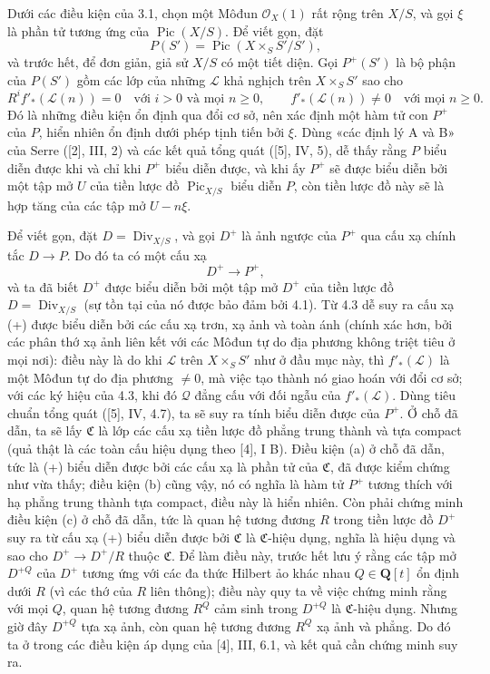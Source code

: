 
Dưới các điều kiện của 3.1, chọn một Môđun $\mathcal O_X(1)$ rất rộng trên
$X/S$, và gọi $\xi$ là phần tử tương ứng của $\operatorname{Pic}(X/S)$. Để
viết gọn, đặt
\[
P(S')=\operatorname{Pic}(X\times_SS'/S'),
\]
và trước hết, để đơn giản, giả sử $X/S$ có một tiết diện. Gọi $P^+(S')$ là bộ
phận của $P(S')$ gồm các lớp của những $\mathcal L$ khả nghịch trên
$X\times_SS'$ sao cho
\[
R^if'_*(\mathcal L(n))=0\quad\text{với $i>0$ và mọi $n\geq0$},
\qquad
f'_*(\mathcal L(n))\neq0\quad\text{với mọi $n\geq0$}.
\]
Đó là những điều kiện ổn định qua đổi cơ sở, nên xác định một hàm tử con
$P^+$ của $P$, hiển nhiên ổn định dưới phép tịnh tiến bởi $\xi$. Dùng «các
định lý A và B» của Serre ([2], III, 2) và các kết quả tổng quát ([5], IV, 5),
dễ thấy rằng $P$ biểu diễn được khi và chỉ khi $P^+$ biểu diễn được, và khi ấy
$P^+$ sẽ được biểu diễn bởi một tập mở $U$ của tiền lược đồ
$\operatorname{Pic}_{X/S}$ biểu diễn $P$, còn tiền lược đồ này sẽ là hợp tăng
của các tập mở $U-n\xi$.

Để viết gọn, đặt $D=\operatorname{Div}_{X/S}$, và gọi $D^+$ là ảnh ngược của
$P^+$ qua cấu xạ chính tắc $D\longrightarrow P$. Do đó ta có một cấu xạ
\begin{equation}
D^+\longrightarrow P^+,
\tag{+}
\end{equation}
và ta đã biết $D^+$ được biểu diễn bởi một tập mở $D^+$ của tiền lược đồ
$D=\operatorname{Div}_{X/S}$ (sự tồn tại của nó được bảo đảm bởi 4.1). Từ 4.3
dễ suy ra cấu xạ (+) được biểu diễn bởi các cấu xạ trơn, xạ ảnh và toàn ánh
(chính xác hơn, bởi các phân thớ xạ ảnh liên kết với các Môđun tự do địa
phương không triệt tiêu ở mọi nơi): điều này là do khi $\mathcal L$ trên
$X\times_SS'$ như ở đầu mục này, thì $f'_*(\mathcal L)$ là một Môđun tự do
địa phương $\neq0$, mà việc tạo thành nó giao hoán với đổi cơ sở; với các ký
hiệu của 4.3, khi đó $\mathcal Q$ đẳng cấu với đối ngẫu của
$f'_*(\mathcal L)$. Dùng tiêu chuẩn tổng quát ([5], IV, 4.7), ta sẽ suy ra
tính biểu diễn được của $P^+$. Ở chỗ đã dẫn, ta sẽ lấy $\mathfrak C$ là lớp
các cấu xạ tiền lược đồ phẳng trung thành
và tựa compact (quả thật là các toàn cấu hiệu dụng theo [4], I B). Điều kiện
(a) ở chỗ đã dẫn, tức là (+) biểu diễn được bởi các cấu xạ là phần tử của
$\mathfrak C$, đã được kiểm chứng như vừa thấy; điều kiện (b) cũng vậy, nó có
nghĩa là hàm tử $P^+$ tương thích với hạ phẳng trung thành tựa compact, điều
này là hiển nhiên. Còn phải chứng minh điều kiện (c) ở chỗ đã dẫn, tức là quan
hệ tương đương $R$ trong tiền lược đồ $D^+$ suy ra từ cấu xạ (+) biểu diễn được
bởi $\mathfrak C$ là $\mathfrak C$-hiệu dụng, nghĩa là hiệu dụng và sao cho
$D^+\longrightarrow D^+/R$ thuộc $\mathfrak C$. Để làm điều này, trước hết
lưu ý rằng các tập mở $D^{+Q}$ của $D^+$ tương ứng với các đa thức Hilbert ảo
khác nhau $Q\in\mathbf Q[t]$ ổn định dưới $R$ (vì các thớ của $R$ liên thông);
điều này quy ta về việc chứng minh rằng với mọi $Q$, quan hệ tương đương $R^Q$
cảm sinh trong $D^{+Q}$ là $\mathfrak C$-hiệu dụng. Nhưng giờ đây $D^{+Q}$ tựa
xạ ảnh, còn quan hệ tương đương $R^Q$ xạ ảnh và phẳng. Do đó ta ở trong các
điều kiện áp dụng của [4], III, 6.1, và kết quả cần chứng minh suy ra.

